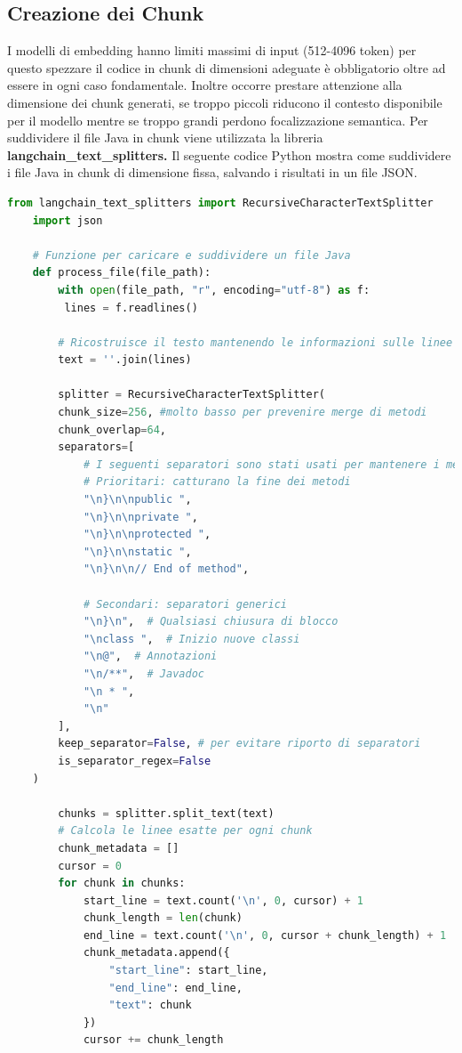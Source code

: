 \documentclass[12pt,a4paper,openright,twoside]{book}
\begin{document}
\subsection{Creazione dei Chunk}
I modelli di embedding hanno limiti massimi di input (512-4096 token)  per questo spezzare il codice in chunk di dimensioni adeguate è obbligatorio oltre ad essere in ogni caso fondamentale.
Inoltre occorre prestare attenzione alla dimensione dei chunk generati, se troppo piccoli riducono il contesto disponibile per il modello mentre se troppo grandi perdono focalizzazione semantica.
Per suddividere il file Java in chunk viene utilizzata la libreria \textbf{langchain\_text\_splitters.}
Il seguente codice Python mostra come suddividere i file Java in chunk di dimensione fissa, salvando i risultati in un file JSON.
\begin{lstlisting}[language=Python, caption={Codice Python per la suddivisione dei file Java in chunk}, label={lst:chunking}]
    from langchain_text_splitters import RecursiveCharacterTextSplitter
    import json
    
    # Funzione per caricare e suddividere un file Java
    def process_file(file_path):
        with open(file_path, "r", encoding="utf-8") as f:
         lines = f.readlines()
    
        # Ricostruisce il testo mantenendo le informazioni sulle linee
        text = ''.join(lines)
    
        splitter = RecursiveCharacterTextSplitter(
        chunk_size=256, #molto basso per prevenire merge di metodi
        chunk_overlap=64,
        separators=[
            # I seguenti separatori sono stati usati per mantenere i metodi uniti
            # Prioritari: catturano la fine dei metodi
            "\n}\n\npublic ",
            "\n}\n\nprivate ",
            "\n}\n\nprotected ",
            "\n}\n\nstatic ",
            "\n}\n\n// End of method", 
            
            # Secondari: separatori generici
            "\n}\n",  # Qualsiasi chiusura di blocco
            "\nclass ",  # Inizio nuove classi
            "\n@",  # Annotazioni
            "\n/**",  # Javadoc
            "\n * ", 
            "\n"
        ],
        keep_separator=False, # per evitare riporto di separatori
        is_separator_regex=False
    )
    
        chunks = splitter.split_text(text)
        # Calcola le linee esatte per ogni chunk
        chunk_metadata = []
        cursor = 0
        for chunk in chunks:
            start_line = text.count('\n', 0, cursor) + 1
            chunk_length = len(chunk)
            end_line = text.count('\n', 0, cursor + chunk_length) + 1
            chunk_metadata.append({
                "start_line": start_line,
                "end_line": end_line,
                "text": chunk
            })
            cursor += chunk_length
        

\end{lstlisting}
\end{document}

